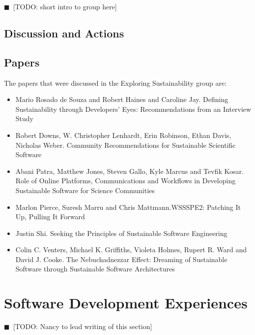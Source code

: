 \documentclass[11pt, oneside]{amsart}
\newcommand{\todo}[1]{{\color{blue}$\blacksquare$~\textsf{[TODO: #1]}}}
\begin{document}
\todo{short intro to group here}

\subsection{Discussion and Actions}

\subsection{Papers}
The papers that were discussed in the Exploring Sustainability group are:
\begin{itemize}
\item Mario {Rosado de Souza} and Robert Haines and Caroline Jay. Defining
Sustainability through Developers' Eyes: Recommendations from an Interview
Study~\cite{wssspe2_rosada_de_souza}

\item Robert Downs, W. Christopher Lenhardt, Erin Robinson, Ethan Davis,
Nicholas Weber. Community Recommendations for Sustainable Scientific
Software~\cite{wssspe2_downs}

\item Abani Patra, Matthew Jones, Steven Gallo, Kyle Marcus and Tevfik Kosar.
Role of Online Platforms, Communications and Workflows in Developing Sustainable
Software for Science Communities~\cite{wssspe2_patra}

\item Marlon Pierce, Suresh Marru and Chris Mattmann.{WSSSPE2}: Patching It Up,
Pulling It Forward~\cite{wssspe2_pierce}

\item Justin Shi. Seeking the Principles of Sustainable Software
Engineering~\cite{wssspe2_shi}

\item Colin C. Venters, Michael K. Griffiths, Violeta Holmes, Rupert R. Ward and
David J. Cooke. The Nebuchadnezzar Effect: Dreaming of Sustainable Software
through Sustainable Software Architectures~\cite{wssspe2_venters}
\end{itemize}

\section{Software Development Experiences} \label{sec:devel}
\todo{Nancy to lead writing of this section}
\end{document}
